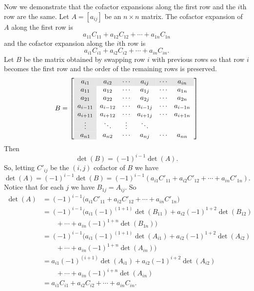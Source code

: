 Now we demonstrate that the cofactor expansions along the first row and the $i$th row are the same. Let $A = [a_{ij}]$ be an $n \times n$ matrix. The cofactor expansion of $A$ along the first row is 
\[a_{11}C_{11} + a_{12}C_{12} + \cdots + a_{1n}C_{1n}\]
and the cofactor expansion along the $i$th row is 
\[a_{i1}C_{i1} + a_{i2}C_{i2} + \cdots + a_{in}C_{in}.\]
Let $B$ be the matrix obtained by swapping row $i$ with previous rows so that row $i$ becomes the first row and the order of the remaining rows is preserved. 
\[B = \left[ \begin{array}{>{\columncolor{Gray}}cccccc}
\rowcolor{Gray}
a_{i1} 		& a_{i2} 	& \cdots    &a_{ij} 	&\cdots & a_{in} \\
a_{11} 		& a_{12} 	& \cdots    &a_{1j} 	&\cdots & a_{1n} \\
a_{21} 		& a_{22} 	& \cdots    &a_{2j} 	&\cdots & a_{2n} \\
a_{i-11} 	& a_{i-12} 	& \cdots    &a_{i-1j} 	&\cdots & a_{i-1n} \\
a_{i+11} 	& a_{i+12} 	& \cdots    &a_{i+1j} 	&\cdots & a_{i+1n} \\
\vdots 		& \ddots    & \vdots   	&\ddots 	 & 		 & \\
a_{n1} 		& a_{n2} 	& \cdots    &a_{nj}  	&\cdots & a_{nn}
\end{array} \right] \]
Then
\[\det(B) = (-1)^{i-1} \det(A).\]
So, letting $C'_{ij}$ be the $(i,j)$ cofactor of $B$ we have 
\[\det(A) = (-1)^{i-1} \det(B) = (-1)^{i-1}\left(a_{i1}C'_{11} + a_{i2}C'_{12} + \cdots + a_{in}C'_{1n}\right).\]
Notice that for each $j$ we have $B_{1j} = A_{ij}$. So 
\begin{align*}
\det(A) &= (-1)^{i-1}\big(a_{i1}C'_{11} + a_{i2}C'_{12} + \cdots + a_{in}C'_{1n}\big) \\
	&= (-1)^{i-1}\Big(a_{i1}(-1)^(1+1)\det(B_{11}) + a_{i2}(-1)^{1+2}\det(B_{12})  \\
	&\qquad + \cdots + a_{in}(-1)^{1+n}\det(B_{1n})\Big) \\
	&= (-1)^{i-1}\Big(a_{i1}(-1)^(1+1)\det(A_{i1}) + a_{i2}(-1)^{1+2}\det(A_{i2}) \\
	&\qquad + \cdots + a_{in}(-1)^{1+n}\det(A_{in})\Big) \\
	&= a_{i1}(-1)^(i+1)\det(A_{i1}) + a_{i2}(-1)^{i+2}\det(A_{i2}) \\
	&\qquad + \cdots + a_{in}(-1)^{i+n}\det(A_{in}) \\
	&= a_{i1}C_{i1} + a_{i2}C_{i2} + \cdots + a_{in}C_{in}.
\end{align*}


